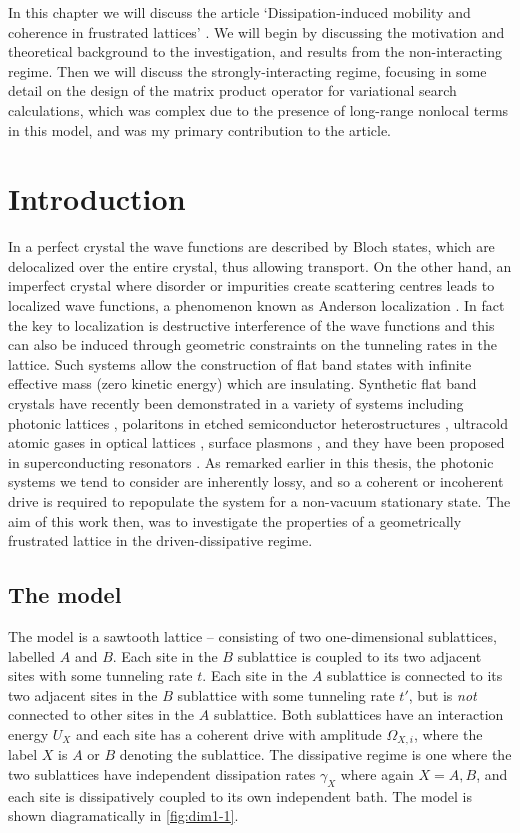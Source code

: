 In this chapter we will discuss the article `Dissipation-induced mobility and coherence in frustrated lattices' \cite{Owen2017}. We will begin by discussing the motivation and theoretical background to the investigation, and results from the non-interacting regime. Then we will discuss the strongly-interacting regime, focusing in some detail on the design of the matrix product operator for variational search calculations, which was complex due to the presence of long-range nonlocal terms in this model, and was my primary contribution to the article.

\section{Introduction}
In a perfect crystal the wave functions are described by Bloch states, which are delocalized over the entire crystal, thus allowing transport. On the other hand, an imperfect crystal where disorder or impurities create scattering centres leads to localized wave functions, a phenomenon known as Anderson localization \cite{Anderson1958,Lee1985,Segev2013}. In fact the key to localization is destructive interference of the wave functions and this can also be induced through geometric constraints on the tunneling rates in the lattice. Such systems allow the construction of flat band states with infinite effective mass (zero kinetic energy) which are insulating. Synthetic flat band crystals have recently been demonstrated in a variety of systems including photonic lattices \cite{Guzman-Silva2014,Vicencio2015,Mukherjee2015,Mukherjee2015a}, polaritons in etched semiconductor heterostructures \cite{Jacqmin2014,Baboux2016}, ultracold atomic gases in optical lattices \cite{Taie2015}, surface plasmons \cite{Nakata2012,Kajiwara2016}, and they have been proposed in superconducting resonators \cite{Yang2016}. As remarked earlier in this thesis, the photonic systems we tend to consider are inherently lossy, and so a coherent or incoherent drive is required to repopulate the system for a non-vacuum stationary state. The aim of this work then, was to investigate the properties of a geometrically frustrated lattice in the driven-dissipative regime.  

\subsection{The model}
The model is a sawtooth lattice -- consisting of two one-dimensional sublattices, labelled \(A\) and \(B\). Each site in the \(B\) sublattice is coupled to its two adjacent sites with some tunneling rate \(t\). Each site in the \(A\) sublattice is connected to its two adjacent sites in the \(B\) sublattice with some tunneling rate \(t'\), but is \emph{not} connected to other sites in the \(A\) sublattice. Both sublattices have an interaction energy \(U_{X}\) and each site has a coherent drive with amplitude \(\Omega_{X,i}\), where the label \(X\) is \(A\) or \(B\) denoting the sublattice. The dissipative regime is one where the two sublattices have independent dissipation rates \(\gamma_{X}\) where again \(X = A,B\), and each site is dissipatively coupled to its own independent bath. The model is shown diagramatically in \cref{fig:dim1-1}.

